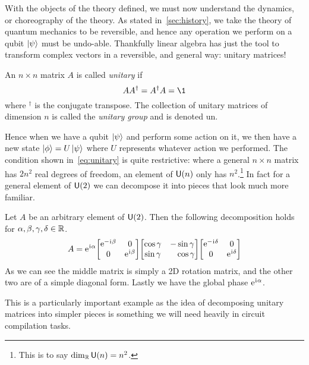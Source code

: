 With the objects of the theory defined, we must now understand the dynamics, or choreography of the theory.
As stated in~\cref{sec:history}, we take the theory of quantum mechanics to be reversible, and hence any operation we perform on a qubit $\ket{\psi}$ must be undo-able.
Thankfully linear algebra has just the tool to transform complex vectors in a reversible, and general way: unitary matrices!
\begin{definition}
    An $n\times n$ matrix $A$ is called \emph{unitary} if
    \begin{equation}\label{eq:unitary}
        AA^\dagger = A^\dagger A = \1
    \end{equation}
    where $^\dagger$ is the conjugate transpose.
    The collection of unitary matrices of dimension $n$ is called the \emph{unitary group} and is denoted \gls{un}.
\end{definition}
Hence when we have a qubit $\ket{\psi}$ and perform some action on it, we then have a new state $\ket{\phi} = U\ket{\psi}$ where $U$ represents whatever action we performed.
The condition shown in~\cref{eq:unitary} is quite restrictive: where a general $n \times n$ matrix has $2n^2$ real degrees of freedom, an element of $\mathsf{U} (n)$ only has $n^2$.\footnote{This is to say $\dim_{\mathbb{R}}\mathsf{U} (n) = n^2$.}
In fact for a general element of $\mathsf{U} (2)$ we can decompose it into pieces that look much more familiar.
\begin{example}
    Let $A$ be an arbitrary element of $\mathsf{U} (2)$.
    Then the following decomposition holds for $\alpha, \beta, \gamma, \delta \in \mathbb{R}$.
    \begin{equation}
        A = \e^{\iu\alpha}\mqty[\dmat[0]{\e^{-\iu \beta}, \e^{\iu \beta}}]\mqty[\cos\gamma & -\sin\gamma \\ \sin\gamma & \phantom{+}\cos\gamma]\mqty[\dmat[0]{\e^{-\iu \delta}, \e^{\iu \delta}}]
    \end{equation}
    As we can see the middle matrix is simply a 2D rotation matrix, and the other two are of a simple diagonal form.
    Lastly we have the global phase $\mathrm{e}^{\mkern1mu\mathrm{i}\mkern1mu \alpha}$.
\end{example}

This is a particularly important example as the idea of decomposing unitary matrices into simpler pieces is something we will need heavily in circuit compilation tasks.

